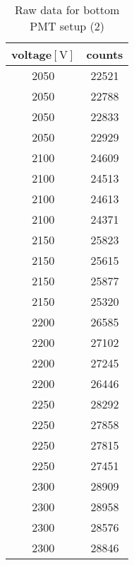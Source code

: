 \begin{table}[htpb]
	\centering
	\begin{tabular}{cc}
		\toprule
	voltage$[\si{\volt}]$ &  counts\\
	\midrule
\num{2050} & \num{ 22521}\\
\num{2050} & \num{ 22788}\\
\num{2050} & \num{ 22833}\\
\num{2050} & \num{ 22929}\\
\num{2100} & \num{ 24609}\\
\num{2100} & \num{ 24513}\\
\num{2100} & \num{ 24613 }\\
\num{2100} & \num{ 24371}\\
\num{2150} & \num{ 25823}\\
\num{2150} & \num{ 25615}\\
\num{2150} & \num{ 25877}\\
\num{2150} & \num{ 25320}\\
\num{2200} & \num{ 26585}\\
\num{2200} & \num{ 27102}\\
\num{2200} & \num{ 27245}\\
\num{2200} & \num{ 26446}\\
\num{2250} & \num{ 28292}\\
\num{2250} & \num{ 27858}\\
\num{2250} & \num{ 27815}\\
\num{2250} & \num{ 27451}\\
\num{2300} & \num{ 28909}\\
\num{2300} & \num{ 28958}\\
\num{2300} & \num{ 28576}\\
\num{2300} & \num{ 28846}\\
\bottomrule
\end{tabular}
	\caption{Raw data for bottom PMT setup (2)}
	\label{tab:raw_bot2}
\end{table}

